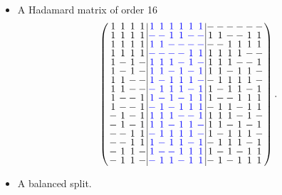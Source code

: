 \documentclass{beamer}
\newcommand{\bblue}[1]{\textcolor{blue}{#1}}
\begin{document}
\begin{frame}
  \begin{itemize}
  \item A Hadamard matrix of order 16
    \[
      \arraycolsep=1.0pt\def\arraystretch{0.75}
      \left(\begin{array}{cccc|cccccc|cccccc}
            1&1&1&1&\bblue{1}&\bblue{1}&\bblue{1}&\bblue{1}&\bblue{1}&\bblue{1}&-&-&-&-&-&-\\
            1&1&1&1&\bblue{-}&\bblue{-}&\bblue{1}&\bblue{1}&\bblue{-}&\bblue{-}&1&1&-&-&1&1\\
            1&1&1&1&\bblue{1}&\bblue{1}&\bblue{-}&\bblue{-}&\bblue{-}&\bblue{-}&-&-&1&1&1&1\\
            1&1&1&1&\bblue{-}&\bblue{-}&\bblue{-}&\bblue{-}&\bblue{1}&\bblue{1}&1&1&1&1&-&-\\
            1&-&1&-&\bblue{1}&\bblue{1}&\bblue{1}&\bblue{-}&\bblue{1}&\bblue{-}&1&1&1&-&-&1\\
            1&-&1&-&\bblue{1}&\bblue{1}&\bblue{-}&\bblue{1}&\bblue{-}&\bblue{1}&1&1&-&1&1&-\\
            1&1&-&-&\bblue{1}&\bblue{-}&\bblue{1}&\bblue{1}&\bblue{1}&\bblue{-}&-&1&1&1&1&-\\
            1&1&-&-&\bblue{-}&\bblue{1}&\bblue{1}&\bblue{1}&\bblue{-}&\bblue{1}&1&-&1&1&-&1\\
            1&-&-&1&\bblue{1}&\bblue{-}&\bblue{1}&\bblue{-}&\bblue{1}&\bblue{1}&1&-&-&1&1&1\\
            1&-&-&1&\bblue{-}&\bblue{1}&\bblue{-}&\bblue{1}&\bblue{1}&\bblue{1}&-&1&1&-&1&1\\
            -&1&-&1&\bblue{1}&\bblue{1}&\bblue{1}&\bblue{-}&\bblue{-}&\bblue{1}&1&1&1&-&1&-\\
            -&1&-&1&\bblue{1}&\bblue{1}&\bblue{-}&\bblue{1}&\bblue{1}&\bblue{-}&1&1&-&1&-&1\\
            -&-&1&1&\bblue{-}&\bblue{1}&\bblue{1}&\bblue{1}&\bblue{1}&\bblue{-}&1&-&1&1&1&-\\
            -&-&1&1&\bblue{1}&\bblue{-}&\bblue{1}&\bblue{1}&\bblue{-}&\bblue{1}&-&1&1&1&-&1\\
            -&1&1&-&\bblue{1}&\bblue{-}&\bblue{-}&\bblue{1}&\bblue{1}&\bblue{1}&1&-&1&-&1&1\\
            -&1&1&-&\bblue{-}&\bblue{1}&\bblue{1}&\bblue{-}&\bblue{1}&\bblue{1}&-&1&-&1&1&1\\
            \end{array}\right).
    \]
  \item A balanced split.
  \end{itemize}
\end{frame}
\end{document}
